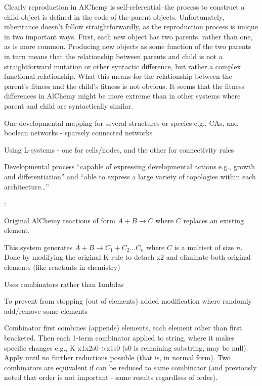 Clearly reproduction in AlChemy is self-referential--the process to construct a child object is defined in the code of the parent objects. Unfortunately, inheritance doesn't follow straightforwardly, as the reproduction process is unique in two important ways. First, each new object has two parents, rather than one, as is more common. Producing new objects as some function of the two parents in turn means that the relationship between parents and child is not a straightforward mutation or other syntactic difference, but rather a complex functional relationship. What this means for the relationship between the parent's fitness and the child's fitness is not obvious. It seems that the fitness differences in AlChemy might be more extreme than in other systems where parent and child are syntactically similar.

\parencite{Antonakopoulos:2011th}

One developmental mapping for several structures or species e.g., CAs, and boolean networks - sparsely connected networks

Using L-systems - one for cells/nodes, and the other for connectivity rules

Developmental process ``capable of expressing developmental actions e.g., growth and differentiation'' and ``able to express a large variety of topologies within each architecture\ldots{}''


\parencite{Fenizio2000}:

Original AlChemy reactions of form $A+B\rightarrow C$ where $C$ replaces an existing element.

This system generates $A+B\rightarrow C_1+C_2...C_n$ where $C$ is a multiset of size $n$. Done by modifying the original K rule to detach x2 and eliminate both original elements (like reactants in chemistry)

Uses combinators rather than lambdas

To prevent from stopping (out of elements) added modification where randomly add/remove some elements

Combinator first combines (appends) elements, each element other than first bracketed. Then each 1-term combinator applied to string, where it makes specific changes e.g., K x1x2s0-\textgreater{}x1s0 (s0 is remaining substring, may be null). Apply until no further reductions possible (that is, in normal form). Two combinators are equivalent if can be reduced to same combinator (and previously noted that order is not important - same results regardless of order).


